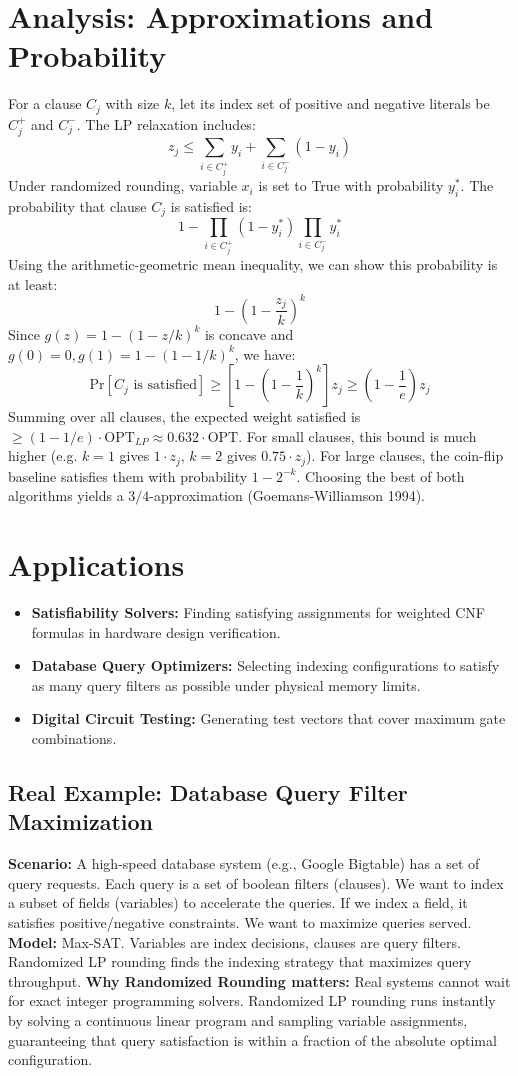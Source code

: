 \documentclass[11pt,oneside]{book}
\begin{document}
\section{Analysis: Approximations and Probability}
For a clause $C_j$ with size $k$, let its index set of positive and negative literals be $C_j^+$ and $C_j^-$. The LP relaxation includes:
\[
z_j \le \sum_{i \in C_j^+} y_i + \sum_{i \in C_j^-} (1 - y_i)
\]
Under randomized rounding, variable $x_i$ is set to True with probability $y_i^*$. The probability that clause $C_j$ is satisfied is:
\[
1 - \prod_{i \in C_j^+} (1 - y_i^*) \prod_{i \in C_j^-} y_i^*
\]
Using the arithmetic-geometric mean inequality, we can show this probability is at least:
\[
1 - \left(1 - \frac{z_j}{k}\right)^k
\]
Since $g(z) = 1 - (1 - z/k)^k$ is concave and $g(0) = 0, g(1) = 1 - (1 - 1/k)^k$, we have:
\[
\text{Pr}[C_j \text{ is satisfied}] \ge \left[1 - \left(1 - \frac{1}{k}\right)^k\right] z_j \ge \left(1 - \frac{1}{e}\right) z_j
\]
Summing over all clauses, the expected weight satisfied is $\ge (1 - 1/e) \cdot \text{OPT}_{LP} \approx 0.632 \cdot \text{OPT}$.
For small clauses, this bound is much higher (e.g. $k=1$ gives $1 \cdot z_j$, $k=2$ gives $0.75 \cdot z_j$). For large clauses, the coin-flip baseline satisfies them with probability $1 - 2^{-k}$. Choosing the best of both algorithms yields a $3/4$-approximation (Goemans-Williamson 1994).

\section{Applications}
\begin{itemize}
    \item \textbf{Satisfiability Solvers:} Finding satisfying assignments for weighted CNF formulas in hardware design verification.
    \item \textbf{Database Query Optimizers:} Selecting indexing configurations to satisfy as many query filters as possible under physical memory limits.
    \item \textbf{Digital Circuit Testing:} Generating test vectors that cover maximum gate combinations.
\end{itemize}

\subsection*{Real Example: Database Query Filter Maximization}
\textbf{Scenario:} A high-speed database system (e.g., Google Bigtable) has a set of query requests. Each query is a set of boolean filters (clauses). We want to index a subset of fields (variables) to accelerate the queries. If we index a field, it satisfies positive/negative constraints. We want to maximize queries served.
\textbf{Model:} Max-SAT. Variables are index decisions, clauses are query filters. Randomized LP rounding finds the indexing strategy that maximizes query throughput.
\textbf{Why Randomized Rounding matters:} Real systems cannot wait for exact integer programming solvers. Randomized LP rounding runs instantly by solving a continuous linear program and sampling variable assignments, guaranteeing that query satisfaction is within a fraction of the absolute optimal configuration.
\end{document}
